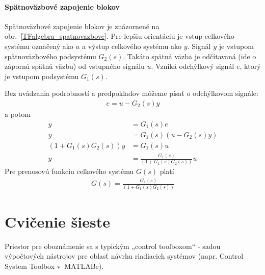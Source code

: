\documentclass[a4paper, 10pt, ]{article}
\begin{document}
\paragraph{Spätnoväzbové zapojenie blokov}

Spätnoväzbové zapojenie blokov je znázornené na obr.~\ref{TFalgebra_spatnovazbove}. Pre lepšiu orientáciu je vstup celkového systému označený ako $u$ a výstup celkového systému ako $y$. Signál $y$ je vstupom spätnoväzbového podsystému $G_2(s)$. Takáto spätná väzba je odčítavaná (ide o zápornú spätnú väzbu) od vstupného signálu $u$. Vzniká odchýlkový signál $e$, ktorý je vstupom podsystému $G_1(s)$.


\begin{center}

    \makebox[\textwidth][c]{%
    
    }

	\label{TFalgebra_spatnovazbove}

\end{center}

Bez uvádzania podrobností a predpokladov môžeme písať o odchýlkovom signále:
\begin{align}
    e = u - G_2(s) y
\end{align}
a potom
\begin{subequations}
    \begin{align}
        y &= G_1(s) e \\
        y &= G_1(s) \left( u - G_2(s) y \right) \\
        \left( 1 + G_1(s)G_2(s) \right) y &= G_1(s) u  \\
        y &= \frac{G_1(s)}{\left( 1 + G_1(s)G_2(s) \right)} u
    \end{align}
\end{subequations}
Pre prenosovú funkciu celkového systému $G(s)$ platí
\begin{align}
   G(s) = \frac{G_1(s)}{\left( 1 + G_1(s)G_2(s) \right)}
\end{align}







\section{Cvičenie šieste}

Priestor pre oboznámenie sa s typickým „control toolboxom“ - sadou výpočtových nástrojov pre oblasť návrhu riadiacich systémov (napr. Control System Toolbox v~MATLABe).
\end{document}
